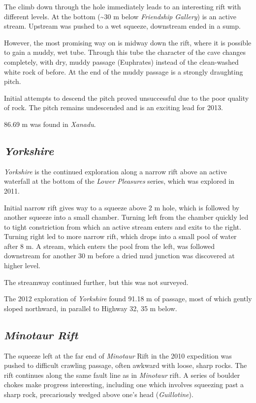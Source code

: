 The climb down through the hole immediately leads to an interesting rift
with different levels. At the bottom (\textasciitilde 30 m below
\emph{Friendship Gallery}) is an active stream. Upstream was pushed to a
wet squeeze, downstream ended in a sump.

However, the most promising way on is midway down the rift, where it is
possible to gain a muddy, wet tube. Through this tube the character of
the cave changes completely, with dry, muddy passage (Euphrates) instead
of the clean-washed white rock of before. At the end of the muddy
passage is a strongly draughting pitch.

Initial attempts to descend the pitch proved unsuccessful due to the
poor quality of rock. The pitch remains undescended and is an exciting
lead for 2013.

86.69 m was found in \emph{Xanadu}.


\subsection{\texorpdfstring{\emph{Yorkshire}}{Yorkshire}}\label{yorkshire}

\emph{Yorkshire} is the continued exploration along a narrow rift above
an active waterfall at the bottom of the \emph{Lower Pleasures} series,
which was explored in 2011.

Initial narrow rift gives way to a squeeze above 2 m hole, which is
followed by another squeeze into a small chamber. Turning left from the
chamber quickly led to tight constriction from which an active stream
enters and exits to the right. Turning right led to more narrow rift,
which drops into a small pool of water after 8 m. A stream, which enters
the pool from the left, was followed downstream for another 30 m before
a dried mud junction was discovered at higher level.

The streamway continued further, but this was not surveyed.

The 2012 exploration of \emph{Yorkshire} found 91.18 m of passage, most
of which gently sloped northward, in parallel to Highway 32, 35 m below.


\subsection{\texorpdfstring{\emph{Minotaur
Rift}}{Minotaur Rift}}

The squeeze left at the far end of \emph{Minotaur} Rift in the 2010
expedition was pushed to difficult crawling passage, often awkward with
loose, sharp rocks. The rift continues along the same fault line as in
\emph{Minotaur} rift. A series of boulder chokes make progress
interesting, including one which involves squeezing past a sharp rock,
precariously wedged above one's head (\emph{Guillotine}).

